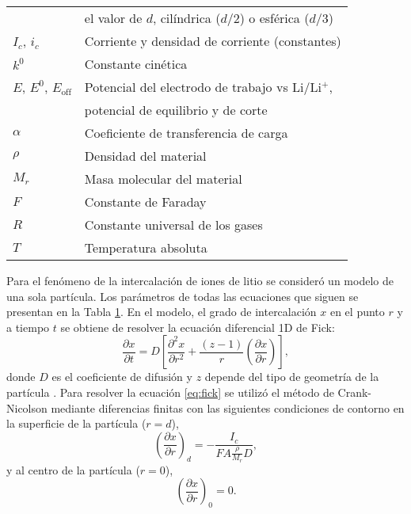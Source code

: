 \begin{table}[h!]
{\begin{tabular}{l l}
                & el valor de $d$, cilíndrica ($d/2$) o esférica ($d/3$) \\
        $I_c$, $i_c$ & Corriente y densidad de corriente (constantes) \\
        $k^0$ & Constante cinética \\
        $E$, $E^0$, $E_{\text{off}}$ & Potencial del electrodo de trabajo vs Li/Li$^+$,\\
                                     & potencial de equilibrio y de corte \\
        $\alpha$ & Coeficiente de transferencia de carga \\
        $\rho$ & Densidad del material \\
        $M_r$ & Masa molecular del material \\
        $F$ & Constante de Faraday \\
        $R$ & Constante universal de los gases \\
        $T$ & Temperatura absoluta \\
        \bottomrule
    \end{tabular}
    }{}
    \label{t:params}
\end{table}

Para el fenómeno de la intercalación de iones de litio se consideró un modelo de 
una sola partícula. Los parámetros de todas las ecuaciones que siguen se
presentan en la Tabla \ref{t:params}. En el modelo, el grado de intercalación $x$
en el punto $r$ y a tiempo $t$ se obtiene de resolver la ecuación diferencial 1D
de Fick:
\begin{equation}\label{eq:fick}
    \frac{\partial x}{\partial t} = D \left[ \frac{\partial^2 x}{\partial r^2} + \frac{(z - 1)}{r} \left(\frac{\partial x}{\partial r}\right) \right],
\end{equation}
donde $D$ es el coeficiente de difusión y $z$ depende del tipo de geometría de la 
partícula \cite{vassiliev2016}. Para resolver la ecuación \ref{eq:fick} se 
utilizó el método de Crank-Nicolson mediante diferencias finitas 
\cite{crank-nicolson} con las siguientes condiciones de contorno en la superficie
de la partícula ($r = d$),
\begin{equation}
    \left(\frac{\partial x}{\partial r}\right)_d = - \frac{I_c}{F A \frac{\rho}{M_r}D},
\end{equation}
y al centro de la partícula ($r = 0$),
\begin{equation}
    \left(\frac{\partial x}{\partial r}\right)_0 = 0.
\end{equation}

